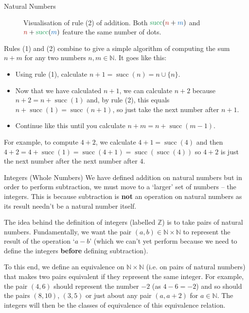 \documentclass[final]{beamer}
\newlength{\colwidth}
\newcommand{\N}{\mathbb{N}}
\newcommand{\Z}{\mathbb{Z}}
\DeclareMathOperator{\s}{succ}
\newcommand{\clr}{\textcolor{BrickRed}}
\newcommand{\clb}{\textcolor{RoyalBlue}}
\newcommand{\clg}{\textcolor{ForestGreen}}
\begin{document}
\begin{frame}[t]
\begin{columns}[t]
\begin{column}{\colwidth}
\begin{exampleblock}{Natural Numbers}
\begin{figure}[H]

   \caption{Visualisation of rule (2) of addition. Both $\clg{\s}(\clr{n} +
    \clb{m})$ and $\clr{n} + \clg{\s}(\clb{m})$ feature the \alert{same number}
    of dots.}
   \label{fig:rule-2-addition}
  \end{figure}

  Rules (1) and (2) combine to give a simple algorithm of computing the sum $n +
  m$ for any two numbers $n,m \in \N$. It goes like this:
  \begin{itemize}[label=\textbullet,left=12pt]
   \item Using rule (1), calculate $n + 1 = \s(n) = n \cup \{n\}$.
   \item Now that we have calculated $n + 1$, we can calculate $n + 2$ because
    $n + 2 = n + \s(1)$ and, by rule (2), this equals $n + \s(1) = \s(n + 1)$,
    so just take the next number after $n + 1$.
   \item Continue like this until you calculate $n + m = n + \s(m - 1)$.
  \end{itemize}
  For example, to compute $4 + 2$, we calculate $4 + 1 = \s(4)$ and then $4 + 2
  = 4 + \s(1) = \s(4 + 1) = \s(\s(4))$ so $4 + 2$ is just the next number after
  the next number after $4$.
 \end{exampleblock}

 \begin{exampleblock}{Integers (Whole Numbers)}
  We have defined \alert{addition} on natural numbers but in order to perform
  \alert{subtraction}, we must move to a `larger' set of numbers -- the
  \alert{integers}. This is because subtraction is \alert{\textbf{not}} an
  operation on natural numbers as its result needn't be a natural number itself.

  The idea behind the definition of integers (labelled $\Z$) is to take
  \alert{pairs of natural numbers}. Fundamentally, we want the pair $(a,b) \in
  \N \times \N$ to \alert{represent} the result of the operation `$a-b$' (which
  we can't yet perform because we need to define the integers \textbf{before}
  defining subtraction).

  To this end, we define an \alert{equivalence} on $\N \times \N$ (i.e. on pairs
  of natural numbers) that makes two pairs equivalent \alert{if they represent
  the same integer}. For example, the pair $(4, 6)$ should represent the number
  $-2$ (as $4 - 6 = -2$) and so should the pairs $(8, 10)$, $(3, 5)$ or just
  about any pair $(a, a + 2)$ for $a \in \N$. The integers will then be the
  \alert{classes of equivalence} of this equivalence relation.


\end{exampleblock}
\end{column}
\end{columns}
\end{frame}
\end{document}
